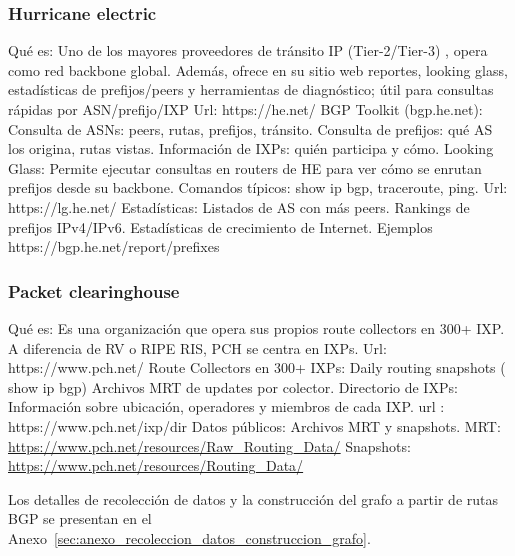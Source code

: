 \subsubsection{Hurricane electric} \label{sec:anexo_hurricane_lectric}
Qué es:  Uno de los mayores proveedores de tránsito IP (Tier-2/Tier-3) , opera como red backbone global. 
Además, ofrece en su sitio web reportes, looking glass, estadísticas de prefijos/peers y herramientas de diagnóstico; útil para consultas rápidas por ASN/prefijo/IXP
Url: https://he.net/
BGP Toolkit (bgp.he.net):
Consulta de ASNs: peers, rutas, prefijos, tránsito.
Consulta de prefijos: qué AS los origina, rutas vistas.
Información de IXPs: quién participa y cómo.
Looking Glass:	
Permite ejecutar consultas en routers de HE para ver cómo se enrutan prefijos desde su backbone.
Comandos típicos: show ip bgp, traceroute, ping.
Url: https://lg.he.net/
Estadísticas:
Listados de AS con más peers.
Rankings de prefijos IPv4/IPv6.
Estadísticas de crecimiento de Internet.
Ejemplos
https://bgp.he.net/report/prefixes






\subsubsection{Packet clearinghouse} \label{sec:anexo_packet_clearinghouse}


Qué es: Es una organización que opera sus propios route collectors en 300+ IXP.
A diferencia de RV o RIPE RIS, PCH se centra en IXPs.
Url: https://www.pch.net/
Route Collectors en 300+ IXPs:
Daily routing snapshots ( show ip bgp)
Archivos MRT de updates por colector. 
Directorio de IXPs:
Información sobre ubicación, operadores y miembros de cada IXP.
url : https://www.pch.net/ixp/dir
Datos públicos:
Archivos MRT y snapshots.
MRT: \url{https://www.pch.net/resources/Raw_Routing_Data/}
Snapshots: \url{https://www.pch.net/resources/Routing_Data/}

Los detalles de recolección de datos y la construcción del grafo a partir de rutas BGP se presentan en el Anexo~\ref{sec:anexo_recoleccion_datos_construccion_grafo}.
